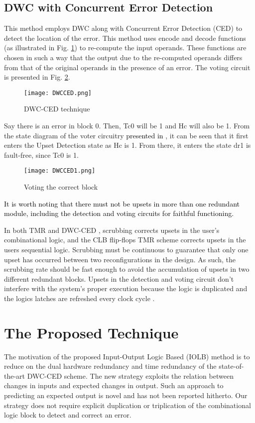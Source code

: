 \documentclass[10pt,journal,cspaper,compsoc]{IEEEtran}
\begin{document}
\subsection{DWC with Concurrent Error Detection}
This method employs DWC along with Concurrent Error Detection (CED) to detect the location of the error.
         This method uses  encode and decode functions (as illustrated in Fig. \ref{fig5}) to re-compute the input operands. These functions are chosen in such a way that the output due to the re-computed operands differs from that of the original operands in the presence of an error. The voting circuit is presented in Fig. \ref{fig6}.
\begin{figure}[t]
  \caption{DWC-CED technique \cite{KLCR}}\label{fig5}
\texttt{[image: DWCCED.png]}
\end{figure}
          Say there is an error in block 0. Then, Tc0 will be 1 and Hc will also be 1. From the state diagram of the voter circuitry \textcolor{black}{presented in \cite{KNHCR}}, it can be seen that it first enters the Upset Detection state as Hc is 1. From there, it enters the state dr1 is fault-free, since Tc0 is 1.
\begin{figure}[t]
  \caption{Voting the correct block \cite{KLCR}}\label{fig6}
\texttt{[image: DWCCED1.png]}
\end{figure}
           \textcolor{black}{It is worth noting that there must not be upsets in more than one redundant module, including the detection and voting circuits for faithful functioning.}

           In both TMR and DWC-CED , scrubbing corrects
upsets in the user's combinational logic, and the CLB
flip-flops TMR scheme corrects upsets in the users
sequential logic. Scrubbing must be continuous to guarantee
that only one upset has occurred between two
reconfigurations in the design. As such, the scrubbing
rate should be fast enough to avoid the accumulation
of upsets in two different redundant blocks.
Upsets in the detection and voting circuit don't interfere
with the system's proper execution because the logic is
duplicated and the logics
latches are refreshed every
clock cycle \cite{KNHCR}.

\section{The Proposed Technique}\label{sec3}
The motivation of the proposed Input-Output Logic Based (IOLB) method is to reduce on the dual hardware redundancy and time redundancy of the state-of-the-art DWC-CED scheme. The new strategy exploits the relation between changes in inputs and expected changes in output. Such an approach to predicting an expected output is novel and has not been reported hitherto. Our strategy does not require explicit duplication or triplication of the combinational logic block to detect and correct an error.
\end{document}
